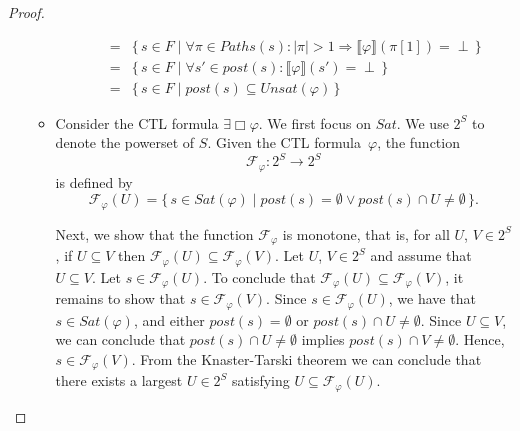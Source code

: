 \documentclass[12pt]{article}
\newcommand{\always}{\Box}
\theoremstyle{definition}
\newcommand{\satisfaction}[1]{\llbracket #1 \rrbracket}
\newenvironment{franck}{\color{red}}{\color{black}}
\begin{document}
\begin{proof}
\begin{itemize}
\begin{franck}
\begin{itemize}
\begin{itemize}
\begin{align*}
= & \{\, s \in F \mid \forall \pi \in \mathit{Paths}(s) : |\pi| > 1 \Rightarrow \satisfaction{\varphi}(\pi[1]) = \perp \,\}\\
= & \{\, s \in F \mid \forall s' \in \mathit{post}(s) : \satisfaction{\varphi}(s') = \perp \,\}\\
= & \{\, s \in F \mid \mathit{post}(s) \subseteq \mathit{Unsat}(\varphi) \,\}
\end{align*}
\end{itemize}
\item
Consider the CTL formula $\exists \always \varphi$.  We first focus on $\mathit{Sat}$.  We use $2^S$ to denote the powerset of $S$.  Given the CTL formula~$\varphi$, the function
\[
\mathcal{F}_{\varphi} : 2^S \to 2^S
\]
is defined by
\[
\mathcal{F}_{\varphi}(U) = \{\, s \in \mathit{Sat}(\varphi) \mid \mathit{post}(s) = \emptyset \vee \mathit{post}(s) \cap U \not= \emptyset \,\}.
\]

Next, we show that the function $\mathcal{F}_{\varphi}$ is monotone, that is, for all $U$, $V \in 2^S$, if $U \subseteq V$ then $\mathcal{F}_{\varphi}(U) \subseteq \mathcal{F}_{\varphi}(V)$.  Let $U$, $V \in 2^S$ and assume that $U \subseteq V$.  Let $s \in \mathcal{F}_{\varphi}(U)$. To conclude that $\mathcal{F}_{\varphi}(U) \subseteq \mathcal{F}_{\varphi}(V)$, it remains to show that $s \in \mathcal{F}_{\varphi}(V)$.  Since $s \in \mathcal{F}_{\varphi}(U)$, we have that $s \in \mathit{Sat}(\varphi)$, and either $\mathit{post}(s) = \emptyset$ or $\mathit{post}(s) \cap U \not= \emptyset$.  Since $U \subseteq V$, we can conclude that $\mathit{post}(s) \cap U \not= \emptyset$ implies $\mathit{post}(s) \cap V \not= \emptyset$.  Hence, $s \in \mathcal{F}_{\varphi}(V)$.  From the Knaster-Tarski theorem \cite{K,T} we can conclude that there exists a largest $U \in 2^S$ satisfying $U \subseteq \mathcal{F}_{\varphi}(U)$.


\end{itemize}
\end{franck}
\end{itemize}
\end{proof}
\end{document}
